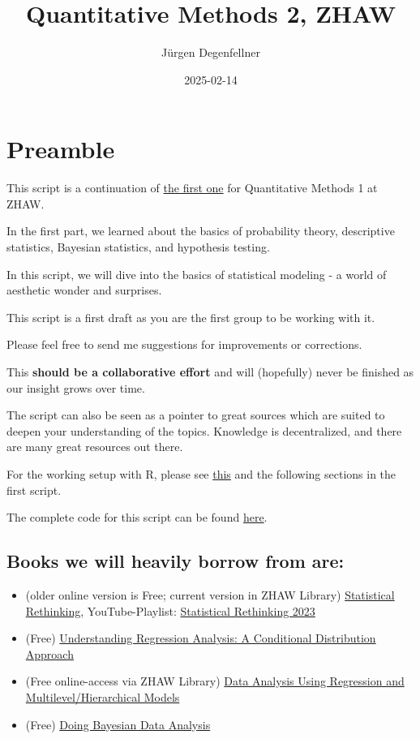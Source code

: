 \documentclass[
]{book}
\title{Quantitative Methods 2, ZHAW}
\author{Jürgen Degenfellner}
\date{2025-02-14}
\providecommand{\tightlist}{%
  \setlength{\itemsep}{0pt}\setlength{\parskip}{0pt}}
\begin{document}
\maketitle

{
\setcounter{tocdepth}{1}
\tableofcontents
}
\chapter{Preamble}\label{intro0}

This script is a continuation of
\href{https://jdegenfellner.github.io/Script_QM1_ZHAW/}{the first one} for Quantitative Methods 1
at ZHAW.

In the first part, we learned about the basics of probability theory,
descriptive statistics, Bayesian statistics, and hypothesis testing.

In this script, we will dive into the basics of statistical modeling -
a world of aesthetic wonder and surprises.

This script is a first draft as you are the first group to be working with it.

Please feel free to send me suggestions for improvements or corrections.

This \textbf{should be a collaborative effort} and will (hopefully)
never be finished as our insight grows over time.

The script can also be seen as a pointer to great sources which are
suited to deepen your understanding of the topics. Knowledge is decentralized,
and there are many great resources out there.

For the working setup with R, please
see \href{https://jdegenfellner.github.io/Script_QM1_ZHAW/index.html\#section}{this}
and the following sections in the first script.

The complete code for this script can be found
\href{https://github.com/jdegenfellner/Script_QM2_ZHAW}{here}.

\section{Books we will heavily borrow from are:}\label{books-we-will-heavily-borrow-from-are}

\begin{itemize}
\tightlist
\item
  (older online version is Free; current version in ZHAW Library) \href{https://civil.colorado.edu/~balajir/CVEN6833/bayes-resources/RM-StatRethink-Bayes.pdf}{Statistical Rethinking}, YouTube-Playlist: \href{https://youtu.be/FdnMWdICdRs?si=q2py5QVY_L299hEa}{Statistical Rethinking 2023}
\item
  (Free) \href{https://vdoc.pub/documents/understanding-regression-analysis-a-conditional-distribution-approach-84oqjr8sqva0}{Understanding Regression Analysis: A Conditional Distribution Approach}
\item
  (Free online-access via ZHAW Library) \href{http://www.stat.columbia.edu/~gelman/arm/}{Data Analysis Using Regression and Multilevel/Hierarchical Models}
\item
  (Free) \href{https://nyu-cdsc.github.io/learningr/assets/kruschke_bayesian_in_R.pdf}{Doing Bayesian Data Analysis}
\end{itemize}
\end{document}
